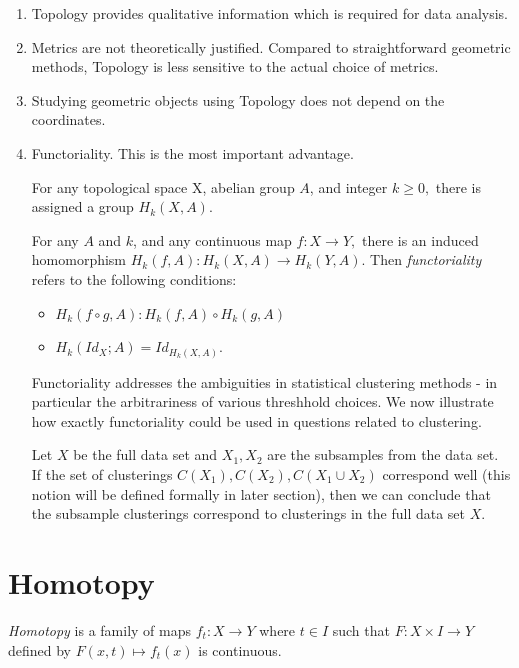 \documentclass[11pt,reqno,oneside,a4paper]{article}
\begin{document}
\begin{enumerate}
	\item Topology provides qualitative information which is required for data analysis.
	
	\item Metrics are not theoretically justified. Compared to straightforward geometric methods, Topology is less sensitive to the actual choice of metrics. 
	
	\item Studying geometric objects using Topology does not depend on the coordinates. 
	
	\item Functoriality. This is the most important advantage.
	
	\begin{defn}
		For any topological space X, abelian group $A$, and integer $k\geq 0,$ there is assigned a group $H_k(X,A).$
		
		For any $A$ and $k$, and any continuous map $f: X \to Y,$ there is an induced homomorphism $H_k(f,A): H_k(X,A) \to H_k(Y,A).$ Then \textit{functoriality} refers to the following conditions:
		
		\begin{itemize}
			\item  $H_k(f\circ g,A): H_k(f,A) \circ H_k(g,A)$
			\item  $H_k(Id_{X};A) = Id_{H_k(X,A)}.$
		\end{itemize}
	\end{defn}

	Functoriality addresses the ambiguities in statistical clustering methods - in particular the arbitrariness of various threshhold choices. We now illustrate how exactly functoriality could be used in questions related to clustering. 
	
	Let $X$ be the full data set and $X_1,X_2$ are the subsamples from the data set. If the set of clusterings $C(X_1), C(X_2), C(X_1 \cup X_2)$ correspond well (this notion will be defined formally in later section), then we can conclude that the subsample clusterings correspond to clusterings in the full data set $X$. 
\end{enumerate}

\section{Homotopy} \label{sec:homotopy}

\begin{defn}
	\textit{Homotopy} is a family of maps $f_t: X \to Y$ where $t \in I$ such that $F: X\times I \to Y$ defined by $F(x,t) \mapsto f_t(x)$ is continuous.
\end{defn}
\end{document}

